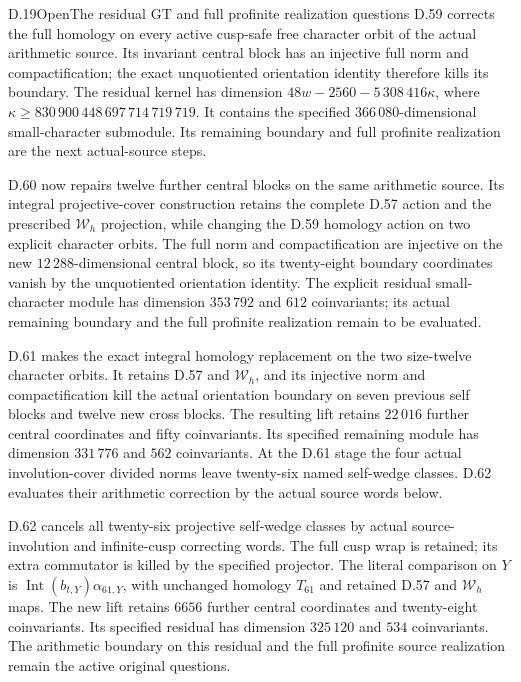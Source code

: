 \begin{statement}{D.19}{Open}{The residual GT and full profinite realization questions}
D.59 corrects the full homology on every active cusp-safe free
character orbit of the actual arithmetic source. Its invariant
central block has an injective full norm and compactification;
the exact unquotiented orientation identity therefore kills its
boundary. The residual kernel has dimension
$48w-2560-5\,308\,416\kappa$, where
$\kappa\geq830\,900\,448\,697\,714\,719\,719$.
It contains the specified $366\,080$-dimensional small-character
submodule. Its remaining boundary and full profinite realization
are the next actual-source steps.

D.60 now repairs twelve further central blocks on the same
arithmetic source. Its integral projective-cover construction
retains the complete D.57 action and the prescribed $\mathcal W_h$
projection, while changing the D.59 homology action on two
explicit character orbits. The full norm and compactification
are injective on the new $12\,288$-dimensional central block,
so its twenty-eight boundary coordinates vanish by the
unquotiented orientation identity. The explicit residual
small-character module has dimension $353\,792$ and
$612$ coinvariants; its actual remaining boundary and the
full profinite realization remain to be evaluated.

D.61 makes the exact integral homology replacement on the two
size-twelve character orbits. It retains D.57 and $\mathcal W_h$,
and its injective norm and compactification kill the actual
orientation boundary on seven previous self blocks and twelve
new cross blocks. The resulting lift retains $22\,016$ further
central coordinates and fifty coinvariants. Its specified
remaining module has dimension $331\,776$ and $562$ coinvariants.
At the D.61 stage the four actual involution-cover divided norms
leave twenty-six named self-wedge classes. D.62 evaluates their
arithmetic correction by the actual source words below.

D.62 cancels all twenty-six projective self-wedge classes by
actual source-involution and infinite-cusp correcting words.
The full cusp wrap is retained; its extra commutator is killed
by the specified projector. The literal comparison on $Y$ is
$\operatorname{Int}(b_{t,Y})\alpha_{61,Y}$, with unchanged
homology $T_{61}$ and retained D.57 and $\mathcal W_h$ maps.
The new lift retains $6656$ further central coordinates and
twenty-eight coinvariants. Its specified residual has dimension
$325\,120$ and $534$ coinvariants. The arithmetic boundary on
this residual and the full profinite source realization remain
the active original questions.


\end{statement}

